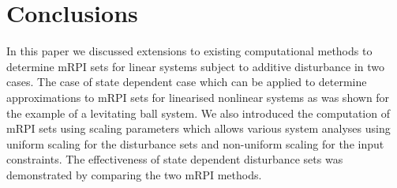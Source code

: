 \documentclass[letterpaper, 10pt, conference]{ieeeconf} %
\begin{document}
\section{Conclusions}\label{sec:conclusions}
%
In this paper we discussed extensions to existing computational methods to determine mRPI sets
for linear systems subject to additive disturbance in two cases. The case of state dependent case
which can be applied to determine approximations to mRPI sets for linearised nonlinear systems as was shown
for the example of a levitating ball system. We also introduced the computation of mRPI sets using 
scaling parameters which allows various system analyses using uniform scaling for the disturbance sets
and non-uniform scaling for the input constraints. The effectiveness of state dependent disturbance
sets was demonstrated by comparing the two mRPI methods.


%
\end{document}
